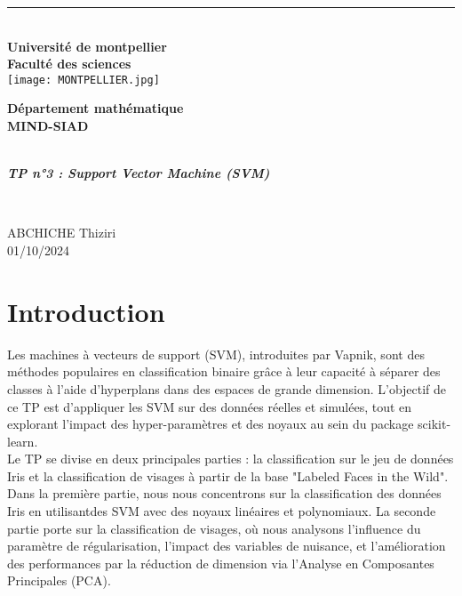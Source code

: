 \documentclass{article}
\begin{document}
\begin{center}
\thispagestyle{empty}
\rule{1\textwidth}{0,5pt}\vspace{0,5cm}\\
\textbf{Université de montpellier\\
Faculté des sciences}\\
\vspace{1cm}
\texttt{[image: MONTPELLIER.jpg]}
\end{center}

\begin{center}
\textbf{Département mathématique}
\vspace{1cm}
\hspace{2cm}\\
\vspace{1cm}
\textbf{MIND-SIAD}
\vspace{1cm}

\rule{0,8\textwidth}{2pt}\\
\vspace{0,2cm}
\large\textit{\textbf{
TP n°3 : Support Vector Machine (SVM)}} \normalsize
\rule{0,8\textwidth}{2pt}\\ 
 \end{center}
\vspace{1cm}
\begin{center}

ABCHICHE Thiziri \\

01/10/2024  
\end{center}
\newpage

\pagestyle{plain}


\tableofcontents
\newpage




\section{Introduction}
Les machines à vecteurs de support (SVM), introduites par Vapnik, sont 
des méthodes populaires en classification binaire grâce à leur capacité à 
séparer des classes à l'aide d'hyperplans dans des espaces de grande 
dimension. L'objectif de ce TP est d'appliquer les SVM sur des données 
réelles et simulées, tout en explorant l'impact des hyper-paramètres et 
des noyaux au sein du package scikit-learn.\\

Le TP se divise en deux principales parties : la classification sur le 
jeu de données Iris et la classification de visages à partir de la base 
"Labeled Faces in the Wild". Dans la première partie, nous nous
concentrons sur la classification des données Iris en utilisantdes SVM
avec des noyaux linéaires et polynomiaux. La seconde partie porte sur la 
classification de visages, où nous analysons l'influence du paramètre de 
régularisation, l'impact des variables de nuisance, et l'amélioration des 
performances par la réduction de dimension via l'Analyse en Composantes 
Principales (PCA).
\newpage
\end{document}
